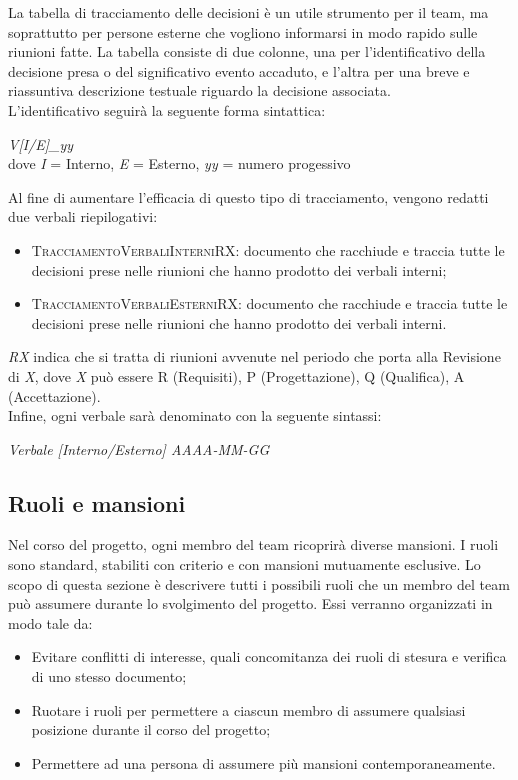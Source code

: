 			La tabella di tracciamento delle decisioni è un utile strumento per il team, ma soprattutto per persone esterne che vogliono informarsi in modo rapido sulle riunioni fatte.
			La tabella consiste di due colonne, una per l'identificativo della decisione presa o del significativo evento accaduto, e l'altra per una breve e riassuntiva descrizione testuale riguardo la decisione associata.\\
			L'identificativo seguirà la seguente forma sintattica:
			\begin{center}
				\textit{V[I/E]\_yy} \\\vspace{0.2cm}dove \textit{I} = Interno, \textit{E} = Esterno, \textit{yy} = numero progessivo
			\end{center}
			Al fine di aumentare l'efficacia di questo tipo di tracciamento, vengono redatti due verbali riepilogativi:
			\begin{itemize}
				\item \textsc{TracciamentoVerbaliInterniRX:} documento che racchiude e traccia tutte le decisioni prese nelle riunioni che hanno prodotto dei verbali interni;
				\item\textsc{TracciamentoVerbaliEsterniRX:} documento che racchiude e traccia tutte le decisioni prese nelle riunioni che hanno prodotto dei verbali interni.
			\end{itemize}
			\textit{RX} indica che si tratta di riunioni avvenute nel periodo che porta alla Revisione di \textit{X}, dove \textit{X} può essere R (Requisiti), P (Progettazione), Q (Qualifica), A (Accettazione).\\
			Infine, ogni verbale sarà denominato con la seguente sintassi:
			\begin{center}
				\textit{Verbale [Interno/Esterno] AAAA-MM-GG}
			\end{center} 
			
	\subsection{Ruoli e mansioni}
	Nel corso del progetto, ogni membro del team ricoprirà diverse mansioni. I ruoli sono standard, stabiliti con criterio e con mansioni mutuamente esclusive. Lo scopo di questa sezione è descrivere tutti i possibili ruoli che un membro del team può assumere durante lo svolgimento del progetto. Essi verranno organizzati in modo tale da:
	\begin{itemize}
		\item Evitare conflitti di interesse, quali concomitanza dei ruoli di stesura e verifica di uno stesso documento;
		\item Ruotare i ruoli per permettere a ciascun membro di assumere qualsiasi posizione durante il corso del progetto;
		\item Permettere ad una persona di assumere più mansioni contemporaneamente.
	\end{itemize}

